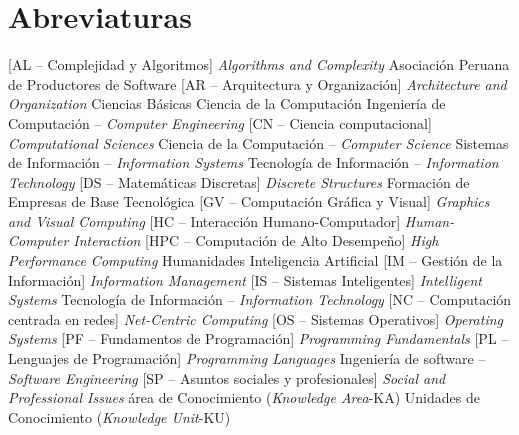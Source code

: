 \chapter*{Abreviaturas}
%

\begin{acronym}
 [AL -- Complejidad y Algoritmos]
          {{\it Algorithms and Complexity}}
 {Asociación Peruana de Productores de Software}
 [AR -- Arquitectura y Organización]
          {{\it Architecture and Organization}}
 {Ciencias Básicas}
 {Ciencia de la Computación}
 {Ingeniería de Computación -- {\it Computer Engineering}}
 [CN -- Ciencia computacional]
          {{\it Computational Sciences}}
 {Ciencia de la Computación -- {\it Computer Science}}
 {Sistemas de Información -- {\it Information Systems}}
 {Tecnología de Información -- {\it Information Technology}}
 [DS -- Matemáticas Discretas]
          {{\it Discrete Structures}}
 {Formación de Empresas de Base Tecnológica}
 [GV -- Computación Gráfica y Visual]
          {{\it Graphics and Visual Computing}}
 [HC -- Interacción Humano-Computador]
          {{\it Human-Computer Interaction}}
[HPC -- Computación de Alto Desempeño]
	  {{\it High Performance Computing}}
 {Humanidades}
 {Inteligencia Artificial}
 [IM -- Gestión de la Información]
          {{\it Information Management}}
 [IS -- Sistemas Inteligentes]
          {{\it Intelligent Systems}}
 {Tecnología de Información -- {\it Information Technology}}
 [NC -- Computación centrada en redes]
          {{\it Net-Centric Computing}}
 [OS -- Sistemas Operativos]
          {{\it Operating Systems}}
 [PF -- Fundamentos de Programación]
          {{\it Programming Fundamentals}}
 [PL -- Lenguajes de Programación]
          {{\it Programming Languages}}
 {Ingeniería de software -- {\it Software Engineering}}
 [SP -- Asuntos sociales y profesionales]
          {{\it Social and Professional Issues}}
 {área de Conocimiento ({\it Knowledge Area}-KA)}
 {Unidades de Conocimiento ({\it Knowledge Unit}-KU)}

\end{acronym}
